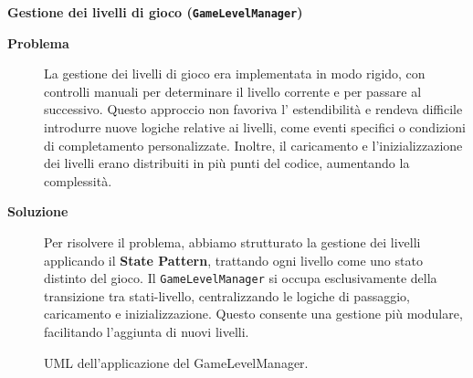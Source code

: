 \documentclass[a4paper,12pt]{report}
\begin{document}
\noindent
\textbf{Gestione dei livelli di gioco (\texttt{GameLevelManager})}
\begin{description}
	\item[\textbf{Problema}]
	      La gestione dei livelli di gioco era implementata in modo rigido, con controlli manuali per determinare il livello corrente e per passare al successivo. Questo approccio non favoriva l'
	      estendibilità e rendeva difficile introdurre nuove logiche relative ai livelli, come eventi specifici o condizioni di completamento personalizzate. Inoltre, il caricamento e l'inizializzazione dei
	      livelli erano distribuiti in più punti del codice, aumentando la complessità.

	\item[\textbf{Soluzione}]
	      Per risolvere il problema, abbiamo strutturato la gestione dei livelli applicando il \textbf{State Pattern}, trattando ogni livello come uno stato distinto del gioco. Il \texttt{GameLevelManager}
	      si occupa esclusivamente della transizione tra stati-livello, centralizzando le logiche di passaggio, caricamento e inizializzazione. Questo consente una gestione più modulare, facilitando
	      l'aggiunta di nuovi livelli.
\end{description}
\begin{figure}[H]
	\centering{}
	
	\caption{UML dell'applicazione del GameLevelManager.}
	\label{img:GameLevelManager}
\end{figure}
\end{document}

